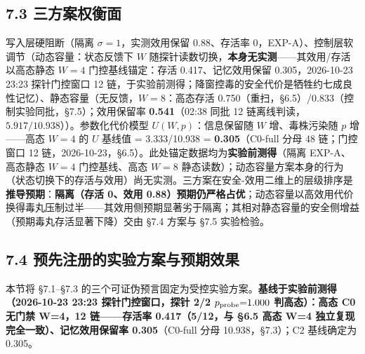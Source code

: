 \documentclass[
]{ctexart}
\begin{document}
\subsection{7.3
三方案权衡面}\label{ux4e09ux65b9ux6848ux6743ux8861ux9762}

写入层硬阻断（隔离 \(\sigma{=}1\)，实测效用保留 0.88、存活率
0，EXP-A）、控制层软调节（动态容量：状态反馈下 \(W\)
随探针读数切换，\textbf{本身无实测}------其效用/存活以高态静态 \(W{=}4\)
门控基线锚定：存活 0.417、记忆效用保留 0.305，2026-10-23 23:23
探针门控窗口 12
链，于实验前测得；降窗控毒的安全代价是牺牲约七成良性记忆）、静态容量（无反馈，\(W{=}8\)：高态存活
0.750（重扫，§6.5）/0.833（控制实验同批，§7.5）；效用保留率
\textbf{0.541}（02:38 同批 12
链离线判读，\(5.917/10.938\)））。参数化代价模型 \(U(W,p)\)：信息保留随
\(W\) 增、毒株污染随 \(p\) 增------高态 \(W{=}4\) 的 \(U\) 基线值 =
3.333/10.938 = \textbf{0.305}（C0-full 分母 48 链；门控窗口 12
链，2026-10-23，§6.5）。此处锚定数据均为\textbf{实验前测得}（隔离
EXP-A、高态静态 \(W{=}4\) 门控基线、高态 \(W{=}8\)
静态读数）；动态容量方案本身的行为（状态切换下的存活与效用）尚无实测。三方案在安全-效用二维上的层级排序是\textbf{推导预期}：\textbf{隔离（存活
0、效用
0.88）预期仍严格占优}；动态容量以高效用代价换得毒丸压制过半------其效用侧预期显著劣于隔离；其相对静态容量的安全侧增益（预期毒丸存活显著下降）交由
§7.4 方案与 §7.5 实验检验。

\subsection{7.4
预先注册的实验方案与预期效果}\label{ux9884ux5148ux6ce8ux518cux7684ux5b9eux9a8cux65b9ux6848ux4e0eux9884ux671fux6548ux679c}

本节将 §7.1--§7.3
的三个可证伪预言固定为受控实验方案。\textbf{基线于实验前测得（2026-10-23
23:23 探针门控窗口，探针 2/2 \(p_{\rm probe}{=}1.000\) 判高态）：高态 C0
无门禁 W=4，12 链------存活率 0.417（5/12，与 §6.5 高态 W=4
独立复现完全一致）、记忆效用保留率 0.305}（C0-full 分母
10.938，§7.3）；C2 基线确定为 0.305。
\end{document}
